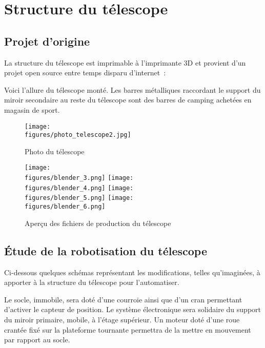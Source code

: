 \chapter{Structure du télescope}

\section{Projet d'origine}

La structure du télescope est imprimable à l'imprimante 3D et provient d'un projet open source entre temps disparu d'internet~:
{\href{https://blog.dagoma.fr/telescope-imprime-en-3d/}{}}

\vspace{1cm}

Voici l'allure du télescope monté. Les barres métalliques raccordant le support du miroir secondaire au reste du télescope sont des barres de camping achetées en magasin de sport.

\begin{figure}[H]
    \centering
    \texttt{[image: \\figures/photo\_telescope2.jpg]}
    \decoRule
    \caption[
    Photo du télescope]{
    Photo du télescope}
    \label{fig:Photo du télescope}
    \end{figure}

\begin{figure}[H]
    \centering
    \texttt{[image: \\figures/blender\_3.png]}
    \texttt{[image: \\figures/blender\_4.png]}
    \texttt{[image: \\figures/blender\_5.png]}
    \texttt{[image: \\figures/blender\_6.png]}
    \decoRule
    \caption[
    Aperçu des fichiers de production du télescope]{
    Aperçu des fichiers de production du télescope}
    \label{fig:Aperçu des fichiers de production du télescope}
    \end{figure}

\section{Étude de la robotisation du télescope}

Ci-dessous quelques schémas représentant les modifications, telles qu'imaginées, à apporter à la structure du télescope pour l'automatiser.

\vspace{1cm}

Le socle, immobile, sera doté d'une courroie ainsi que d'un cran permettant d'activer le capteur de position. Le système électronique sera solidaire du support du miroir primaire, mobile, à l'étage supérieur. Un moteur doté d'une roue crantée fixé sur la plateforme tournante permettra de la mettre en mouvement par rapport au socle.


